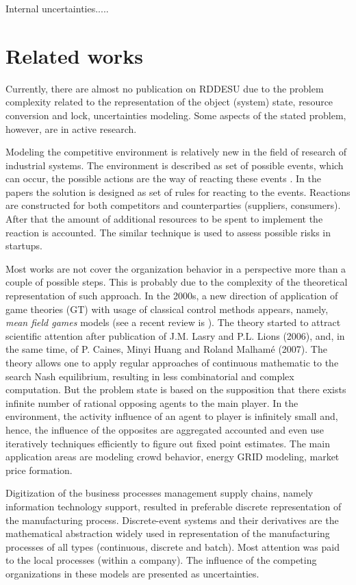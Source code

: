 \documentclass[runningheads]{llncs}
\begin{document}

Internal uncertainties.....

\section{Related works}
\label{sec:rel-works}

Currently, there are almost no publication on RDDESU due to the problem complexity related to the representation of the object (system) state, resource conversion and lock, uncertainties modeling.  Some aspects of the stated problem, however, are in active research.

Modeling the competitive environment is relatively new in the field of research of industrial systems. The environment is described as set of possible events, which can occur, the possible actions are the way of reacting these events \cite{andres}. In the papers the solution is designed as set of rules for reacting to the events. Reactions are constructed for both competitors and counterparties (suppliers, consumers). After that the amount of additional resources to be spent to implement the reaction is accounted.  The similar technique is used to assess possible risks in startups.

Most works are not cover the organization behavior in a perspective more than a couple of possible steps. This is probably due to the complexity of the theoretical representation of such approach. In the 2000s, a new direction of application of game theories (GT) with usage of classical control methods appears, namely, \emph{mean field games} models (see a recent review is \cite{gomes}). The theory started to attract scientific attention after publication of J.M. Lasry and P.L. Lions (2006), and,  in the same time, of P. Caines, Minyi Huang and Roland Malhamé (2007). The theory allows one to apply regular approaches of continuous mathematic to the search Nash equilibrium, resulting in less combinatorial and complex computation. But the problem state is based on the supposition that there exists infinite number of rational opposing agents to the main player. In the environment, the activity influence of an agent to player is infinitely small and, hence, the influence of the opposites are aggregated accounted and even use iteratively techniques efficiently to figure out fixed point estimates. The main application areas are modeling crowd behavior, energy GRID modeling, market price formation.

Digitization of the business processes management supply chains, namely information technology support, resulted in preferable discrete representation of the manufacturing process. Discrete-event systems and their derivatives are the mathematical abstraction widely used in representation of the manufacturing processes of all types (continuous, discrete and batch). Most attention was paid to the local processes (within a company). The influence of the competing organizations in these models are presented as uncertainties.
\end{document}
